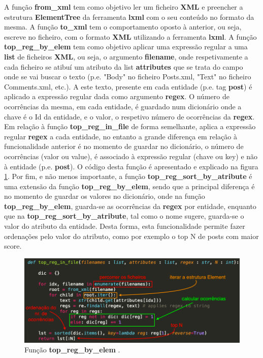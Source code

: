 \documentclass[11pt,a4paper]{report}%
\begin{document}
A função \textbf{from\_xml} tem como objetivo ler um ficheiro \textbf{XML} e preencher a estrutura \textbf{ElementTree} da ferramenta \textbf{lxml} com o seu conteúdo no formato da mesma.
\newline \newline
A função \textbf{to\_xml} tem o comportamento oposto à anterior, ou seja, escreve no ficheiro, com o formato \textbf{XML} utilizando a ferramenta \textbf{lxml}.\newline
\newline A função \textbf{top\_reg\_by\_elem} tem como objetivo aplicar uma expressão regular a uma \textbf{list} de ficheiros \textbf{XML}, ou seja, o argumento \textbf{filename}, onde respetivamente a cada ficheiro se atibuí um atributo da list \textbf{attributes} que se trata do campo onde se vai buscar o texto (p.e. "Body" no ficheiro Posts.xml, "Text" no ficheiro Comments.xml, etc.). A este texto, presente em cada entidade (p.e. tag \textbf{post}) é aplicado a expressão regular dada como argumento \textbf{regex}. O número de ocorrências da mesma, em cada entidade, é guardado num dicionário onde a chave é o Id da entidade, e o valor, o respetivo número de ocorrências da \textbf{regex}.\newline
\newline Em relação à função \textbf{top\_reg\_in\_file} de forma semelhante, aplica a expressão regular \textbf{regex} a cada entidade, no entanto a grande diferença em relação à funcionalidade anterior é no momento de guardar no dicionário, o número de ocorrências (valor ou value), é associado à expressão regular (chave ou key) e não à entidade (p.e. \textbf{post}). O código desta função é apresentado e explicado na figura \ref{img:top_reg_by_elem}. \newline \newline Por fim, e não menos importante, a função \textbf{top\_reg\_sort\_by\_atribute} é uma extensão da função \textbf{top\_reg\_by\_elem}, sendo que a principal diferença é no momento de guardar os valores no dicionário, onde na função \textbf{top\_reg\_by\_elem}, guarda-se as ocorrências da \textbf{regex} por entidade, enquanto que na \textbf{top\_reg\_sort\_by\_atribute}, tal como o nome sugere, guarda-se o valor do atributo da entidade. Desta forma, esta funcionalidade permite fazer ordenações pelo valor do atributo, como por exemplo o top N de posts com maior score.

\begin{figure}[]
	\centering
	\includegraphics[scale=0.6]{f1.png}
	\caption{Função \textbf{top\_reg\_by\_elem} .}
	\label{img:top_reg_by_elem}
\end{figure}
\end{document}
